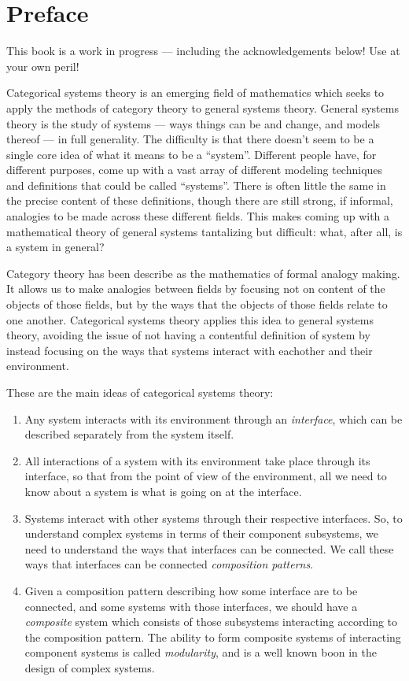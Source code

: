 \documentclass[DynamicalBook]{subfiles}
\begin{document}
%


\setcounter{chapter}{0}%


\chapter{Preface}\label{chapter.0}

This book is a work in progress --- including the acknowledgements below! Use at your own peril!

Categorical systems theory is an emerging field of mathematics which seeks to apply the methods of category theory to general systems theory. General systems theory is the study of systems --- ways things can be and change, and models thereof --- in full generality. The difficulty is that there doesn't seem to be a single core idea of what it means to be a ``system''. Different people have, for different purposes, come up with a vast array of different modeling techniques and definitions that could be called ``systems''. There is often little the same in the precise content of these definitions, though there are still strong, if informal, analogies to be made across these different fields. This makes coming up with a mathematical theory of general systems tantalizing but difficult: what, after all, is a system in general?

Category theory has been describe as the mathematics of formal analogy making. It allows us to make analogies between fields by focusing not on content of the objects of those fields, but by the ways that the objects of those fields relate to one another. Categorical systems theory applies this idea to general systems theory, avoiding the issue of not having a contentful definition of system by instead focusing on the ways that systems interact with eachother and their environment.

These are the main ideas of categorical systems theory:
\begin{enumerate}
\item Any system interacts with its environment through an \emph{interface}, which can be described separately from the system itself.
\item All interactions of a system with its environment take place through its interface, so that from the point of view of the environment, all we need to know about a system is what is going on at the interface.
\item Systems interact with other systems through their respective interfaces. So, to understand complex systems in terms of their component subsystems, we need to understand the ways that interfaces can be connected. We call these ways that interfaces can be connected \emph{composition patterns}.
\item Given a composition pattern describing how some interface are to be connected, and some systems with those interfaces, we should have a \emph{composite} system which consists of those subsystems interacting according to the composition pattern. The ability to form composite systems of interacting component systems is called \emph{modularity}, and is a well known boon in the design of complex systems.
\end{enumerate}
\end{document}
